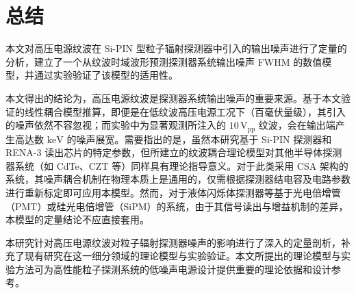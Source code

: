 \documentclass[12pt,fontset=fandol]{ctexart}
\begin{document}
\newpage
\section{总结}

本文对高压电源纹波在 Si-PIN 型粒子辐射探测器中引入的输出噪声进行了定量的分析，建立了一个从纹波时域波形预测探测器系统输出噪声 FWHM 的数值模型，并通过实验验证了该模型的适用性。

\begin{graycommentblock}
本文得出的结论为，高压电源纹波是探测器系统输出噪声的重要来源。基于本文验证的线性耦合模型推算，即便是在低纹波高压电源工况下（百毫伏量级），其引入的噪声依然不容忽视；而实验中为显著观测所注入的 $10\,\mathrm{V_{pp}}$ 纹波，会在输出端产生高达数 $\mathrm{keV}$ 的噪声展宽。需要指出的是，虽然本研究基于 Si-PIN 探测器和 RENA-3 读出芯片的特定参数，但所建立的纹波耦合理论模型对其他半导体探测器系统（如 CdTe、CZT 等）同样具有理论指导意义\cite{ref1,ref9}。对于此类采用 CSA 架构的系统，其噪声耦合机制在物理本质上是通用的，仅需根据探测器结电容及电路参数进行重新标定即可应用本模型。然而，对于液体闪烁体探测器等基于光电倍增管（PMT）或硅光电倍增管（SiPM）的系统，由于其信号读出与增益机制的差异，本模型的定量结论不应直接套用。
\end{graycommentblock}

本研究针对高压电源纹波对粒子辐射探测器噪声的影响进行了深入的定量剖析，补充了现有研究在这一细分领域的理论模型与实验验证。本文所提出的理论模型与实验方法可为高性能粒子探测系统的低噪声电源设计提供重要的理论依据和设计参考。
\end{document}
